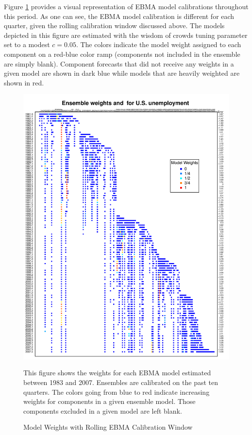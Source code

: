 \documentclass[12pt,fullpage,endnotes]{article}
\begin{document}
Figure \ref{modelWeights} provides a visual representation of EBMA
model calibrations throughout this period. As one can see, the EBMA model calibration is different for each quarter, given the rolling calibration window discussed above. The models depicted in this figure are estimated with the wisdom of crowds tuning parameter set to a modest $c=0.05$.  The colors
indicate the model weight assigned to each component on a red-blue
color ramp (components not included in the ensemble are simply blank).  Component forecasts that did not receive any weights in a given model are shown in dark blue while models that are
heavily weighted are shown in red.

\begin{figure}[h]
\caption{Model Weights with Rolling EBMA Calibration Window}
\label{modelWeights}
\begin{center}
\includegraphics[scale=.95]{awesome}
\end{center}

\footnotesize This figure shows the weights for each EBMA model estimated between 1983 and 2007. Ensembles are calibrated on the past ten quarters. The colors going from blue to red indicate increasing weights for components in a given ensemble model. Those components excluded in a given model are left blank.

\end{figure}
\end{document}
